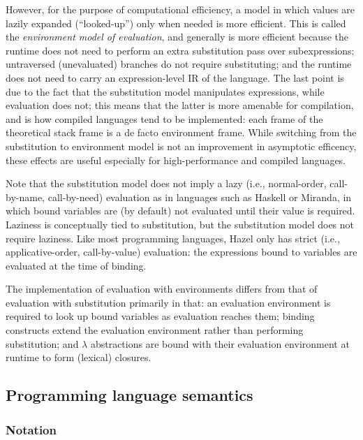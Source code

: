 However, for the purpose of computational efficiency, a model in which values are lazily expanded (``looked-up'') only when needed is more efficient. This is called the \textit{environment model of evaluation}, and generally is more efficient because the runtime does not need to perform an extra substitution pass over subexpressions; untraversed (unevaluated) branches do not require substituting; and the runtime does not need to carry an expression-level IR of the language. The last point is due to the fact that the substitution model manipulates expressions, while evaluation does not; this means that the latter is more amenable for compilation, and is how compiled languages tend to be implemented: each frame of the theoretical stack frame is a de facto environment frame. While switching from the substitution to environment model is not an improvement in asymptotic efficency, these effects are useful especially for high-performance and compiled languages.

Note that the substitution model does not imply a lazy (i.e., normal-order, call-by-name, call-by-need) evaluation as in languages such as Haskell or Miranda, in which bound variables are (by default) not evaluated until their value is required. Laziness is conceptually tied to substitution, but the substitution model does not require laziness. Like most programming languages, Hazel only has strict (i.e., applicative-order, call-by-value) evaluation: the expressions bound to variables are evaluated at the time of binding.


The implementation of evaluation with environments differs from that of evaluation with substitution primarily in that: an evaluation environment is required to look up bound variables as evaluation reaches them; binding constructs extend the evaluation environment rather than performing substitution; and $\lambda$ abstractions are bound with their evaluation environment at runtime to form (lexical) closures.

\subsection{Programming language semantics}
\label{sec:type_systems}

\subsubsection{Notation}
\label{sec:semantics_notation}


